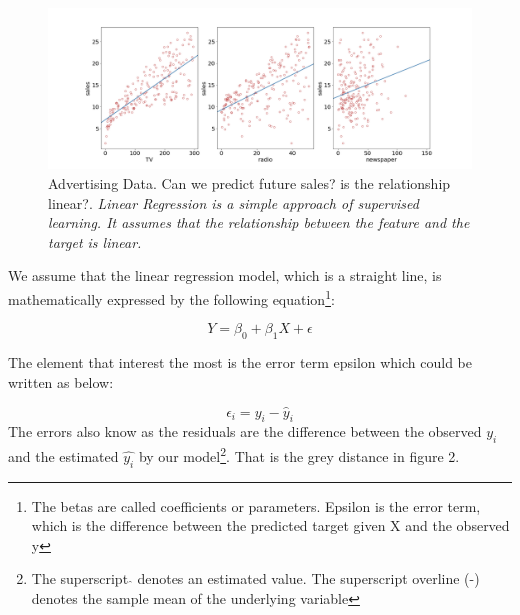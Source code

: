\documentclass{tufte-handout}
\begin{document}
\begin{figure}
  \includegraphics{Reg_1.png}
  \caption{Advertising Data. Can we predict future sales? is the relationship linear?.
  \emph{Linear Regression is a simple approach of supervised learning. It assumes that the relationship between the feature and the target is linear.}}
  \label{fig:textfig}
\end{figure}
 We assume that the linear regression model, which is a straight line, is mathematically expressed by the following equation\footnote{The betas are called coefficients or parameters. Epsilon is the error term, which is the difference between the predicted target given X and the observed y}:

\begin{equation}
    Y = \beta_0 + \beta_1X + \epsilon 
\end{equation}

The element that interest the most is the error term epsilon which could be written as below: 

\begin{equation}
    \epsilon_i =y_i - \hat{y}_i
\end{equation}
The errors also know as the residuals are the difference between the observed \( y_i \) and the estimated \( \hat{y_i}\) by our model\footnote{The superscript  \(\hat{}\)  denotes an estimated value. The superscript overline (-) denotes the sample mean of the underlying variable}. That is the grey distance in figure 2. 
\end{document}
